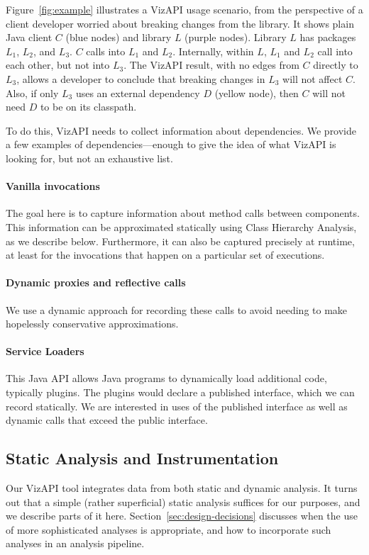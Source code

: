 Figure~\ref{fig:example} illustrates a VizAPI usage scenario, from the perspective of a client developer worried about breaking changes from the library. It shows plain Java client $C$ (blue nodes) and library $L$ (purple nodes). Library $L$ has packages $L_1$, $L_2$, and $L_3$. $C$ calls into $L_1$ and $L_2$. Internally, within $L$, $L_1$ and $L_2$ call into each other, but not into $L_3$. The VizAPI result, with no edges from $C$ directly to $L_3$, allows a developer to conclude that breaking changes in $L_3$ will not affect $C$. Also, if only $L_3$ uses an external dependency $D$ (yellow node), then $C$ will not need $D$ to be on its classpath.

To do this, VizAPI needs to collect information about dependencies. We provide a few examples of dependencies---enough to give the idea of what VizAPI is looking for, but not an exhaustive list.

\paragraph{Vanilla invocations} The goal here is to capture information about method calls between components. This information can be approximated statically using Class Hierarchy Analysis, as we describe below. Furthermore, it can also be captured precisely at runtime, at least for the invocations that happen on a particular set of executions.

\paragraph{Dynamic proxies and reflective calls} We use a dynamic approach for recording these calls to avoid needing to make hopelessly conservative approximations.

\paragraph{Service Loaders} This Java API allows Java programs to dynamically load additional code, typically plugins. The plugins would declare a published interface, which we can record statically. We are interested in uses of the published interface as well as dynamic calls that exceed the public interface.

\subsection{Static Analysis and Instrumentation}
\label{subsec:static}
Our VizAPI tool integrates data from both static and dynamic analysis.
It turns out that a simple (rather superficial) static analysis suffices
for our purposes, and we describe parts of it here. Section~\ref{sec:design-decisions}
discusses when the use of more sophisticated analyses is appropriate, and
how to incorporate such analyses in an analysis pipeline.

